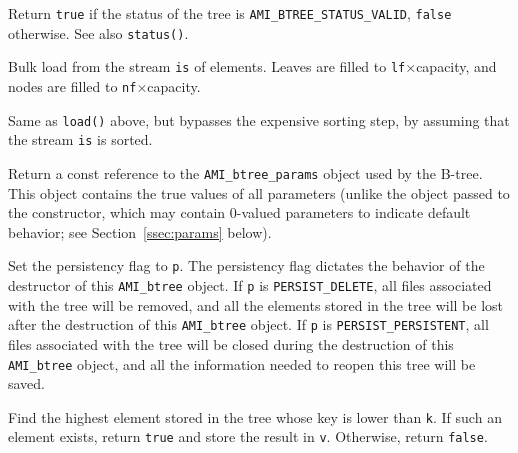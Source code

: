     {Return \lstinline|true| if the status
   of the tree is \lstinline|AMI_BTREE_STATUS_VALID|, \lstinline|false|
   otherwise. See also \lstinline|status()|.}

    {Bulk load from the stream \lstinline|is| of elements. Leaves
   are filled to \lstinline|lf|$\times$capacity, and nodes are filled to 
   \lstinline|nf|$\times$capacity.}


    {Same as \lstinline|load()| above, but bypasses the
   expensive sorting step, by assuming that the stream \lstinline|is| is sorted.}

    {Return a const
   reference to the \lstinline|AMI_btree_params| object used by the B-tree. This
   object contains the true values of all parameters (unlike the object
   passed to the constructor, which may contain $0$-valued parameters to
   indicate default behavior; see Section~\ref{ssec:params} below).}

    {Set the persistency
     flag to \lstinline|p|. The persistency flag dictates the behavior of the destructor of
   this \lstinline|AMI_btree| object. If \lstinline|p| is \lstinline|PERSIST_DELETE|, all files
   associated with the tree will be removed, and all the elements stored in
   the tree will be lost after the destruction of this \lstinline|AMI_btree| object. If
   \lstinline|p| is \lstinline|PERSIST_PERSISTENT|, all files associated with the tree
   will be closed during the destruction of this \lstinline|AMI_btree| object, and all the
   information needed to reopen this tree will be saved.}

    {Find the highest
   element stored in the tree whose key is lower than \lstinline|k|. If such
   an element exists, return \lstinline|true| and store the result in
   \lstinline|v|. Otherwise, return \lstinline|false|.}

